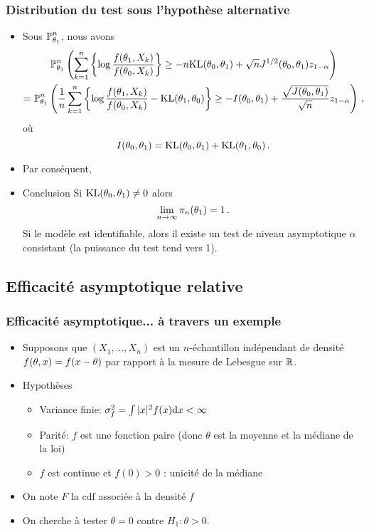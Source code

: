 \begin{frame}
\frametitle{Distribution du test sous l'hypothèse alternative}
\begin{itemize}
\item Sous $\operatorname{{\mathbb P}}^n_{\theta_1}$, nous avons
\begin{multline*}
\operatorname{{\mathbb P}}_{\theta_1}^n \left( \sum_{k=1}^n \left\{ \log \frac{f(\theta_1,X_k)}{f(\theta_0,X_k)}  \right\} \geq -n \mathrm{KL}(\theta_0,\theta_1) + \sqrt{n} J^{1/2}(\theta_0,\theta_1) z_{1-\alpha} \right) \\
=
\operatorname{{\mathbb P}}_{\theta_1}^n \left( \frac{1}{n} \sum_{k=1}^n \left\{ \log \frac{f(\theta_1,X_k)}{f(\theta_0,X_k)} - \mathrm{KL}(\theta_1,\theta_0) \right\} \geq - I(\theta_0,\theta_1) + \frac{\sqrt{J(\theta_0,\theta_1)}}{\sqrt{n}} z_{1-\alpha} \right) \,,
\end{multline*}
où
\[
I(\theta_0,\theta_1)= \mathrm{KL}(\theta_0,\theta_1) + \mathrm{KL}(\theta_1,\theta_0)  \,.
\]
\pause \item Par conséquent, \item \alert{Conclusion} Si $\mathrm{KL}(\theta_0,\theta_1) \ne 0$ alors
\[
\lim_{n \to \infty} \pi_n(\theta_1)= 1 \,.
\]
Si le modèle est identifiable, alors il existe un test de niveau asymptotique $\alpha$ consistant (la puissance du test tend  vers 1).
\end{itemize}
\end{frame}



\subsection{Efficacité asymptotique relative}
\begin{frame}
\frametitle{Efficacité asymptotique... à travers un exemple}
\begin{itemize}
\item Supposons que $(X_1,\dots,X_n)$ est un $n$-échantillon indépendant de densité $f(\theta,x)= f(x-\theta)$ par rapport à la mesure de Lebesgue sur $\mathbb{R}$.
\item \alert{Hypothèses}
\begin{itemize}
\item Variance finie: $\sigma^2_f =  \int |x|^2 f(x) \mathrm{d} x < \infty$
\item Parité: $f$ est une fonction paire (donc $\theta$ est la moyenne et la
  médiane de la loi)
\item $f$ est continue et $f(0) > 0$ : unicité de la médiane
\end{itemize}
\item On note $F$ la cdf associée à la densité $f$
\item On cherche à tester $\theta= 0$ contre $H_1: \theta > 0$.
\end{itemize}
\end{frame}


